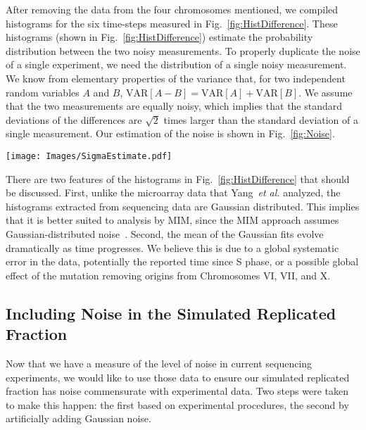 		After removing the data from the four chromosomes mentioned, we compiled histograms for the six time-steps measured in Fig.~\ref{fig:HistDifference}.
		These histograms (shown in Fig.~\ref{fig:HistDifference}) estimate the probability distribution between the two noisy measurements.
		To properly duplicate the noise of a single experiment, we need the distribution of a single noisy measurement.
		We know from elementary properties of the variance that, for two independent random variables $A$ and $B$, $\text{VAR}[A-B] = \text{VAR}[A] + \text{VAR}[B]$.
		We assume that the two measurements are equally noisy, which implies that the standard deviations of the differences are $\sqrt{2}$ times larger than the standard deviation of a single measurement.
		Our estimation of the noise is shown in Fig.~\ref{fig:Noise}.
		
		\begin{SCfigure}[1][tbh]
			\texttt{[image: Images/SigmaEstimate.pdf]}
			\caption[Estimated Simulation and Experimental Noise]{\label{fig:Noise} 
				Scatter plot of estimated $\sigma$ vs time since the start of S phase for experimental data and simulation data.
				Black circles are experimental estimates and open circles are experimental estimates.
			}
		\end{SCfigure}
		
		There are two features of the histograms in Fig.~\ref{fig:HistDifference} that should be discussed.
		First, unlike the microarray data that Yang~\emph{et al.} analyzed, the histograms extracted from sequencing data are Gaussian distributed.
		This implies that it is better suited to analysis by MIM, since the MIM approach assumes Gaussian-distributed noise~\cite{ScottsPaper}.
		Second, the mean of the Gaussian fits evolve dramatically as time progresses.
		We believe this is due to a global systematic error in the data, potentially the reported time since S phase, or a possible global effect of the mutation removing origins from Chromosomes VI, VII, and X.
		
		
		\subsection{Including Noise in the Simulated Replicated Fraction}
		\label{subsec:IncludingNoise}
		
		Now that we have a measure of the level of noise in current sequencing experiments, we would like to use those data to ensure our simulated replicated fraction has noise commensurate with experimental data.
		Two steps were taken to make this happen: the first based on experimental procedures, the second by artificially adding Gaussian noise.
		
